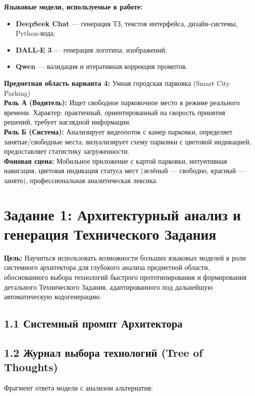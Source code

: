 \documentclass[oneside,a4paper,14pt]{extarticle}
\begin{document}
\textbf{Языковые модели, используемые в работе:}
\begin{itemize}
    \item \textbf{DeepSeek Chat} --- генерация ТЗ, текстов интерфейса, дизайн-системы, Python-кода;
    \item \textbf{DALL-E 3} --- генерация логотипа, изображений;
    \item \textbf{Qwen} --- валидация и итеративная коррекция промптов.
\end{itemize}

\textbf{Предметная область варианта 4:} Умная городская парковка (Smart City Parking)\\
\textbf{Роль А (Водитель):} Ищет свободное парковочное место в режиме реального времени. Характер: практичный, ориентированный на скорость принятия решений, требует наглядной информации.\\
\textbf{Роль Б (Система):} Анализирует видеопоток с камер парковки, определяет занятые/свободные места, визуализирует схему парковки с цветовой индикацией, предоставляет статистику загруженности.\\
\textbf{Фоновая сцена:} Мобильное приложение с картой парковки, интуитивная навигация, цветовая индикация статуса мест (зелёный --- свободно, красный --- занято), профессиональная аналитическая лексика.

\newpage

\section*{Задание 1: Архитектурный анализ и генерация Технического Задания}
\noindent
\textbf{Цель:} Научиться использовать возможности больших языковых моделей в роли системного архитектора для глубокого анализа предметной области, обоснованного выбора технологий быстрого прототипирования и формирования детального Технического Задания, адаптированного под дальнейшую автоматическую кодогенерацию.

\subsection*{1.1 Системный промпт Архитектора}


\subsection*{1.2 Журнал выбора технологий (Tree of Thoughts)}
\noindent
Фрагмент ответа модели с анализом альтернатив:
\end{document}

